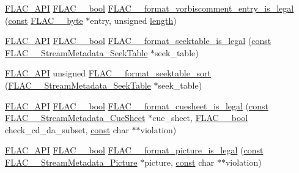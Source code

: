 \begin{DoxyCompactItemize}
\item 
\hyperlink{group__flac__export_ga56ca07df8a23310707732b1c0007d6f5}{F\+L\+A\+C\+\_\+\+A\+PI} \hyperlink{ordinals_8h_a95103469f1cbd78b8cf250194985b34e}{F\+L\+A\+C\+\_\+\+\_\+bool} \hyperlink{group__flac__format_ga6878e238052fc0f7109b55129d64b4e5}{F\+L\+A\+C\+\_\+\+\_\+format\+\_\+vorbiscomment\+\_\+entry\+\_\+is\+\_\+legal} (\hyperlink{getopt1_8c_a2c212835823e3c54a8ab6d95c652660e}{const} \hyperlink{ordinals_8h_a5eb569b12d5b047cdacada4d57924ee3}{F\+L\+A\+C\+\_\+\+\_\+byte} $\ast$entry, unsigned \hyperlink{test__lib_f_l_a_c_2format_8c_ac94dc16b22556ba5fa815655f27442da}{length})
\item 
\hyperlink{group__flac__export_ga56ca07df8a23310707732b1c0007d6f5}{F\+L\+A\+C\+\_\+\+A\+PI} \hyperlink{ordinals_8h_a95103469f1cbd78b8cf250194985b34e}{F\+L\+A\+C\+\_\+\+\_\+bool} \hyperlink{group__flac__format_ga02270d9b92dbe7617635c65a1d0f58ff}{F\+L\+A\+C\+\_\+\+\_\+format\+\_\+seektable\+\_\+is\+\_\+legal} (\hyperlink{getopt1_8c_a2c212835823e3c54a8ab6d95c652660e}{const} \hyperlink{struct_f_l_a_c_____stream_metadata___seek_table}{F\+L\+A\+C\+\_\+\+\_\+\+Stream\+Metadata\+\_\+\+Seek\+Table} $\ast$seek\+\_\+table)
\item 
\hyperlink{group__flac__export_ga56ca07df8a23310707732b1c0007d6f5}{F\+L\+A\+C\+\_\+\+A\+PI} unsigned \hyperlink{group__flac__format_gad1b0090d45a6d65a696a81261bd7fbf6}{F\+L\+A\+C\+\_\+\+\_\+format\+\_\+seektable\+\_\+sort} (\hyperlink{struct_f_l_a_c_____stream_metadata___seek_table}{F\+L\+A\+C\+\_\+\+\_\+\+Stream\+Metadata\+\_\+\+Seek\+Table} $\ast$seek\+\_\+table)
\item 
\hyperlink{group__flac__export_ga56ca07df8a23310707732b1c0007d6f5}{F\+L\+A\+C\+\_\+\+A\+PI} \hyperlink{ordinals_8h_a95103469f1cbd78b8cf250194985b34e}{F\+L\+A\+C\+\_\+\+\_\+bool} \hyperlink{group__flac__format_gae922cabe2dc3f81af10cb635cf996114}{F\+L\+A\+C\+\_\+\+\_\+format\+\_\+cuesheet\+\_\+is\+\_\+legal} (\hyperlink{getopt1_8c_a2c212835823e3c54a8ab6d95c652660e}{const} \hyperlink{struct_f_l_a_c_____stream_metadata___cue_sheet}{F\+L\+A\+C\+\_\+\+\_\+\+Stream\+Metadata\+\_\+\+Cue\+Sheet} $\ast$cue\+\_\+sheet, \hyperlink{ordinals_8h_a95103469f1cbd78b8cf250194985b34e}{F\+L\+A\+C\+\_\+\+\_\+bool} check\+\_\+cd\+\_\+da\+\_\+subset, \hyperlink{getopt1_8c_a2c212835823e3c54a8ab6d95c652660e}{const} char $\ast$$\ast$violation)
\item 
\hyperlink{group__flac__export_ga56ca07df8a23310707732b1c0007d6f5}{F\+L\+A\+C\+\_\+\+A\+PI} \hyperlink{ordinals_8h_a95103469f1cbd78b8cf250194985b34e}{F\+L\+A\+C\+\_\+\+\_\+bool} \hyperlink{group__flac__format_gaf90af7bc6ece6f28063b08e9aa6b4077}{F\+L\+A\+C\+\_\+\+\_\+format\+\_\+picture\+\_\+is\+\_\+legal} (\hyperlink{getopt1_8c_a2c212835823e3c54a8ab6d95c652660e}{const} \hyperlink{struct_f_l_a_c_____stream_metadata___picture}{F\+L\+A\+C\+\_\+\+\_\+\+Stream\+Metadata\+\_\+\+Picture} $\ast$picture, \hyperlink{getopt1_8c_a2c212835823e3c54a8ab6d95c652660e}{const} char $\ast$$\ast$violation)
\end{DoxyCompactItemize}
